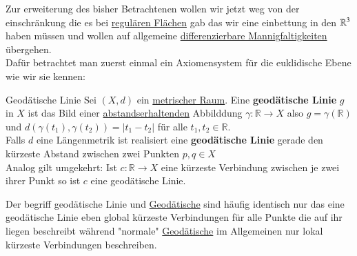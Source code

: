 Zur erweiterung des bisher Betrachtenen wollen wir jetzt weg von der einschränkung die es bei \hyperref[regFlaeche]{regulären Flächen} gab das wir eine einbettung in den $\mathbb{R}^3$ haben müssen und wollen auf allgemeine \hyperref[diffMannigfaltigkeit]{differenzierbare Mannigfaltigkeiten} übergehen.\\
Dafür betrachtet man zuerst einmal ein Axiomensystem für die euklidische Ebene wie wir sie kennen:

\begin{titleDef}{Geodätische Linie}
\label{geodaetischeLinie}
Sei $(X,d)$ ein \hyperref[MetrischerRaum]{metrischer Raum}. Eine \textbf{geodätische Linie} $g$ in $X$ ist das Bild einer \hyperref[abstandserhaltend]{abstandserhaltenden} Abbilddung $\gamma:\mathbb{R}\to X$ also $g=\gamma(\mathbb{R})$ und $d(\gamma(t_1),\gamma(t_2))=\lvert t_1-t_2\rvert$ für alle $t_1,t_2\in\mathbb{R}$.\\
Falls $d$ eine Längenmetrik ist realisiert eine \textbf{geodätische Linie} gerade den kürzeste Abstand zwischen zwei Punkten $p,q\in X$\\
Analog gilt umgekehrt: Ist $c:\mathbb{R}\to X$ eine kürzeste Verbindung zwischen je zwei ihrer Punkt so ist $c$ eine geodätische Linie.\par
Der begriff geodätische Linie und \hyperref[geodaetische]{Geodätische} sind häufig identisch nur das eine geodätische Linie eben global kürzeste Verbindungen für alle Punkte die auf ihr liegen beschreibt während "normale" \hyperref[geodaetische]{Geodätische} im Allgemeinen nur lokal kürzeste Verbindungen beschreiben. 
\end{titleDef}


